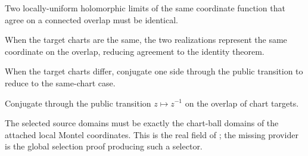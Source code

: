 \begin{lemma}
\label{lem:montel-limit-uniqueness}
Two locally-uniform holomorphic limits of the same coordinate function that agree
on a connected overlap must be identical.
\leanok
\end{lemma}

\begin{lemma}
\label{lem:montel-overlap-agreement-same-chart}
When the target charts are the same, the two realizations represent the same
coordinate on the overlap, reducing agreement to the identity theorem.
\leanok
\end{lemma}

\begin{lemma}
\label{lem:montel-overlap-agreement-cross-chart}
When the target charts differ, conjugate one side through the public transition
to reduce to the same-chart case.
\leanok
\end{lemma}

\begin{lemma}
\label{lem:montel-chart-transition-reduction}
Conjugate through the public transition \(z \mapsto z^{-1}\) on the overlap of chart targets.
\leanok
\end{lemma}

\begin{lemma}
\label{lem:montel-chartball-source-domain-selector}
The selected source domains must be exactly the chart-ball domains of the
attached local Montel coordinates. This is the real
 field of
; the missing provider is
the global selection proof producing such a selector.
\end{lemma}

